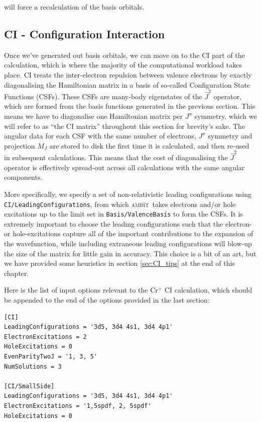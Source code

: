 \documentclass{report}
\newcommand{\ambit}{\textsc{amb}{\footnotesize i}\textsc{t}}
\begin{document}
will force a recalculation of the basis orbitals.

\subsection{CI - Configuration Interaction}

Once we've generated out basis orbitals, we can move on to the CI part of the calculation, which is
where the majority of the computational workload takes place. CI treats the inter-electron repulsion
between valence electrons by exactly diagonalising the Hamiltonian matrix in a basis of so-called
Configuration State Functions (CSFs). These CSFs are many-body eigenstates of the $\hat{J}^2$
operator, which are formed from the basis functions generated in the previous section. This means we
have to diagonalise one Hamiltonian matrix per $J^{\pi}$ symmetry, which we will refer to as ``the CI 
matrix'' throughout this section for brevity's sake.  The angular data for each CSF with the same number
of electrons, $J^{\pi}$ symmetry and projection $M_J$ are stored to disk the first time it is
calculated, and then re-used in subsequent calculations. This means that the cost of diagonalising the
$\hat{J}^2$ operator is effectively spread-out across all calculations with the same angular components.

More specifically, we specify a set of non-relativistic leading configurations using 
\texttt{CI/LeadingConfigurations}, from which \ambit\  takes electrons and/or hole excitations up to the
limit set in \texttt{Basis/ValenceBasis} to form the CSFs. It is extremely important to choose the
leading configurations such that the electron- or hole-excitations capture all of the important
contributions to the expansion of the wavefunction, while including extraneous leading configurations
will blow-up the size of the matrix for little gain in accuracy. This choice is a bit of an art, but we
have provided some heuristics in section \ref{sec:CI_tips} at the end of this chapter.

Here is the list of input options relevant to the Cr$^+$ CI calculation, which should be appended to the
end of the options provided in the last section:

\begin{verbatim}
[CI]                                                                           
LeadingConfigurations = '3d5, 3d4 4s1, 3d4 4p1'                                
ElectronExcitations = 2                                                        
HoleExcitations = 0                                                            
EvenParityTwoJ = '1, 3, 5'                                                     
NumSolutions = 3
                                                                               
[CI/SmallSide]                                                                 
LeadingConfigurations = '3d5, 3d4 4s1, 3d4 4p1'                                
ElectronExcitations = '1,5spdf, 2, 5spdf'                                      
HoleExcitations = 0 
\end{verbatim}
\end{document}
